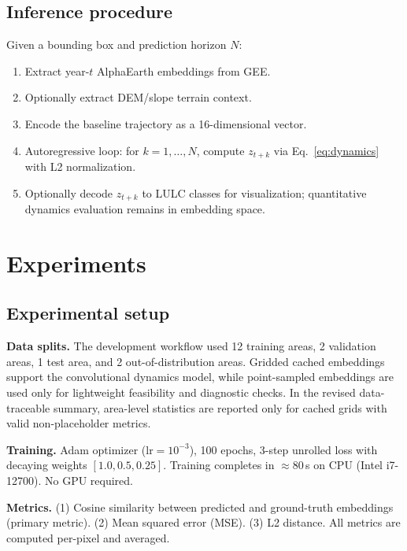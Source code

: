 \documentclass{article}
\begin{document}
\subsection{Inference procedure}

Given a bounding box and prediction horizon $N$:
\begin{enumerate}
\item Extract year-$t$ AlphaEarth embeddings from GEE.
\item Optionally extract DEM/slope terrain context.
\item Encode the baseline trajectory as a 16-dimensional vector.
\item Autoregressive loop: for $k = 1, \ldots, N$, compute $z_{t+k}$ via Eq.~\ref{eq:dynamics} with L2 normalization.
\item Optionally decode $z_{t+k}$ to LULC classes for visualization; quantitative dynamics evaluation remains in embedding space.
\end{enumerate}


\section{Experiments}
\label{sec:experiments}

\subsection{Experimental setup}

\textbf{Data splits.} The development workflow used 12 training areas, 2 validation areas, 1 test area, and 2 out-of-distribution areas. Gridded cached embeddings support the convolutional dynamics model, while point-sampled embeddings are used only for lightweight feasibility and diagnostic checks. In the revised data-traceable summary, area-level statistics are reported only for cached grids with valid non-placeholder metrics.

\textbf{Training.} Adam optimizer ($\text{lr} = 10^{-3}$), 100 epochs, 3-step unrolled loss with decaying weights $[1.0, 0.5, 0.25]$. Training completes in $\approx$80\,s on CPU (Intel i7-12700). No GPU required.

\textbf{Metrics.} (1) Cosine similarity between predicted and ground-truth embeddings (primary metric). (2) Mean squared error (MSE). (3) L2 distance. All metrics are computed per-pixel and averaged.
\end{document}
